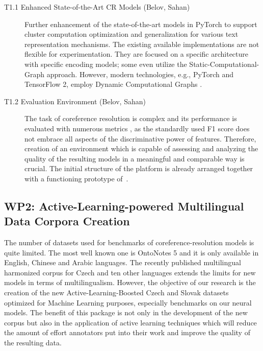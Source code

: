 \begin{description}
	\item [T1.1 Enhanced State-of-the-Art CR Models (Belov, Sahan)] Further enhancement of the state-of-the-art models in PyTorch to support cluster computation optimization and generalization for various text representation mechanisms. The existing available implementations are not flexible for experimentation. They are focused on a specific architecture with specific encoding models; some even utilize the Static-Computational-Graph approach. However, modern technologies, e.g., PyTorch and TensorFlow 2, employ Dynamic Computational Graphs \cite{computationalgraph-Neubig2017}. 
	\item [T1.2 Evaluation Environment (Belov, Sahan)] The task of coreference resolution is complex and its performance is evaluated with numerous metrics \cite{muc-Vilain1995,b3-Bagga1998,ceaf-Luo2005}, as the standardly used F1 score \cite{f1-Chen2006} does not embrace all aspects of the discriminative power of features. Therefore, creation of an environment which is capable of assessing and analyzing the quality of the resulting models in a meaningful and comparable way is crucial. The initial structure of the platform is already arranged together with a functioning prototype of~\cite{Kirstain2021S2E}. 
\end{description}


\subsection*{WP2: Active-Learning-powered Multilingual Data Corpora Creation}

 The number of datasets used for benchmarks of coreference-resolution models is quite limited. 
 The most well known one is OntoNotes 5 \cite{ontonotes5-Weischedel2013} and it is only available in English, Chinese and Arabic languages.
 The recently published multilingual harmonized corpus for Czech and ten other languages \cite{cr-mult-Nedoluzhko2021} extends the limits for new models in terms of multilingualism. 
 However, the objective of our research is the creation of the new Active-Learning-Boosted Czech and Slovak datasets optimized for Machine Learning purposes, especially benchmarks on our neural models. 
 The benefit of this package is not only in the development of the new corpus but also in the application of active learning techniques which will reduce the amount of effort annotators put into their work and improve the quality of the resulting data. 

